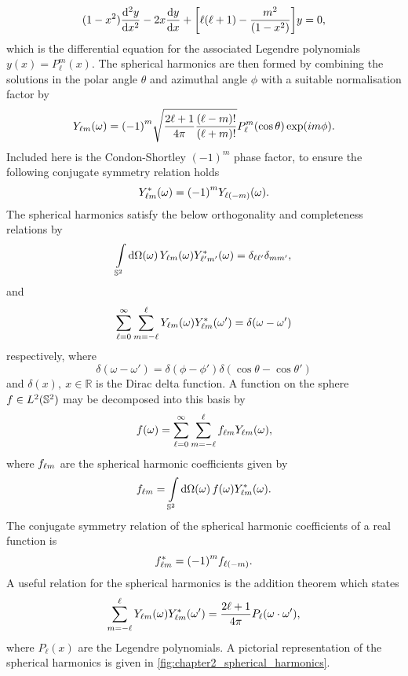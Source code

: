 %
\begin{equation}
	(1-x^{2}) \dv[2]{y}{x} - 2x\dv{y}{x} + \bigg[\ell(\ell+1) - \frac{m^{2}}{(1 - x^{2})}\bigg] y
	= 0,
\end{equation}
%
which is the differential equation for the associated Legendre polynomials \(y(x) = P^{m}_{\ell}(x)\).
The spherical harmonics are then formed by combining the solutions in the polar angle \(\theta{}\) and azimuthal angle \(\phi{}\) with a suitable normalisation factor by
%
\begin{equation}
	\pixel{\harmonic{Y}}
	= {(-1)}^{m} \sqrt{\factor \frac{(\ell-m)!}{(\ell+m)!}} P^{m}_{\ell}(\cos{\theta}) \exp(i m\phi).
\end{equation}
%
Included here is the Condon-Shortley \({(-1)}^{m}\) phase factor, to ensure the following conjugate symmetry relation holds
%
\begin{equation}
	\pixel{\conj{\harmonic{Y}}}
	= {(-1)}^{m} \pixel{Y_{\ell(-m)}}.
\end{equation}
%
The spherical harmonics satisfy the below orthogonality and completeness relations by
%
\begin{equation}
	\integrateSphere{\omega} \pixel{\harmonic{Y}} \pixel{\conj{\harmonic[']{Y}}}
	= \delta_{\ell\ell'} \delta_{mm'},
\end{equation}
%
and
%
\begin{equation}
	\sum\limits_{\ell=0}^{\infty} \sum\limits_{m=-\ell}^{\ell} \pixel{\harmonic{Y}} \pixel[']{\conj{\harmonic{Y}}}
	= \delta(\omega-\omega')
\end{equation}
%
respectively, where
%
\begin{equation}
	\delta(\omega-\omega')
	= \delta(\phi-\phi') \delta(\cos{\theta} - \cos{\theta'})
\end{equation}
%
and \(\delta(x),\ x \in \mathbb{R}\) is the Dirac delta function.
A function on the sphere \(f \in \hilbert{\twoSphere}\) may be decomposed into this basis by
%
\begin{equation}
	\pixel{f}
	= \sum\limits_{\ell=0}^{\infty} \sum\limits_{m=-\ell}^{\ell} \harmonic{f} \pixel{\harmonic{Y}},
\end{equation}
%
where \(\harmonic{f}\) are the spherical harmonic coefficients given by
%
\begin{equation}
	\harmonic{f}
	= \integrateSphere{\omega} \pixel{f} \pixel{\conj{\harmonic{Y}}}.
\end{equation}
%
The conjugate symmetry relation of the spherical harmonic coefficients of a real function is
%
\begin{equation}
	\conj{\harmonic{f}}
	= {(-1)}^{m} f_{\ell(-m)}.
\end{equation}
%
A useful relation for the spherical harmonics is the addition theorem which states
%
\begin{equation}
	\sum\limits_{m=-\ell}^{\ell} \pixel{\harmonic{Y}} \pixel[']{\conj{\harmonic{Y}}}
	= \factor P_{\ell}(\omega \cdot \omega'),
\end{equation}
%
where \(P_{\ell}(x)\) are the Legendre polynomials.
A pictorial representation of the spherical harmonics is given in \cref{fig:chapter2_spherical_harmonics}.

